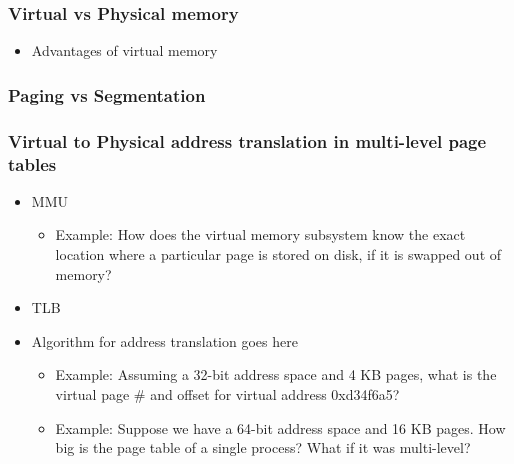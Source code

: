 \documentclass[11pt]{article}
\begin{document}
\subsubsection{Virtual vs Physical memory}
\label{sec-5.5.1}

\begin{itemize}

\item Advantages of virtual memory\\
\label{sec-5.5.1.1}

\end{itemize} %
\subsubsection{Paging vs Segmentation}
\label{sec-5.5.2}

\subsubsection{Virtual to Physical address translation in multi-level page tables}
\label{sec-5.5.3}

\begin{itemize}

\item MMU\\
\label{sec-5.5.3.1}

\begin{itemize}

\item Example: How does the virtual memory subsystem know the exact location where a particular page is stored on disk, if it is swapped out of memory?\\
\label{sec-5.5.3.1.1}

\end{itemize} %

\item TLB\\
\label{sec-5.5.3.2}


\item Algorithm for address translation goes here\\
\label{sec-5.5.3.3}

\begin{itemize}

\item Example: Assuming a 32-bit address space and 4 KB pages, what is the virtual page \# and offset for virtual address 0xd34f6a5?\\
\label{sec-5.5.3.3.1}


\item Example: Suppose we have a 64-bit address space and 16 KB pages. How big is the page table of a single process? What if it was multi-level?\\
\label{sec-5.5.4.1}

\end{itemize} %
\end{itemize} %
\end{document}
